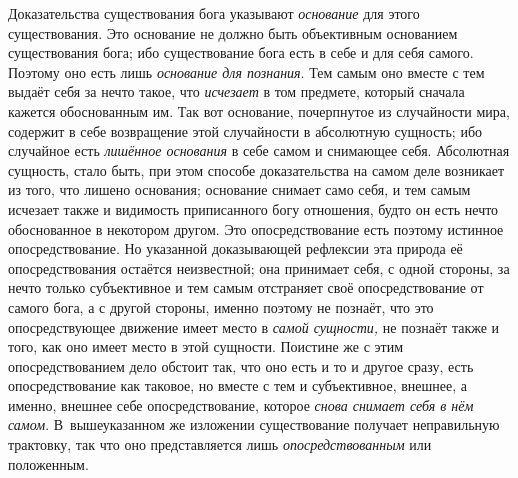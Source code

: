 Доказательства существования бога указывают
{\em основание} для этого существования. Это основание
не должно быть объективным основанием существования бога; ибо существование
бога есть в себе и для себя самого. Поэтому оно есть лишь
{\em основание для познания}. Тем самым оно вместе с
тем выдаёт себя за нечто такое, что {\em исчезает} в
том предмете, который сначала кажется обоснованным им. Так вот основание,
почерпнутое из случайности мира, содержит в себе возвращение этой
случайности в абсолютную сущность; ибо случайное есть
{\em лишённое основания} в себе самом и снимающее себя.
Абсолютная сущность, стало быть, при этом способе доказательства на самом
деле возникает из того, что лишено основания; основание снимает само себя,
и тем самым исчезает также и видимость приписанного богу отношения, будто
он есть нечто обоснованное в некотором другом. Это опосредствование есть
поэтому истинное опосредствование. Но указанной доказывающей рефлексии эта
природа её опосредствования остаётся неизвестной; она принимает себя, с
одной стороны, за нечто только субъективное и тем самым отстраняет своё
опосредствование от самого бога, а с другой стороны, именно поэтому не
познаёт, что это опосредствующее движение имеет место в
{\em самой сущности,} не познаёт также и того, как оно
имеет место в этой сущности. Поистине же с этим опосредствованием дело
обстоит так, что оно есть и то и другое сразу, есть опосредствование как
таковое, но вместе с тем и субъективное, внешнее, а именно, внешнее себе
опосредствование, которое {\em снова снимает себя в нём
самом}. В~вышеуказанном же изложении существование получает неправильную
трактовку, так что оно представляется лишь
{\em опосредствованным} или положенным.


